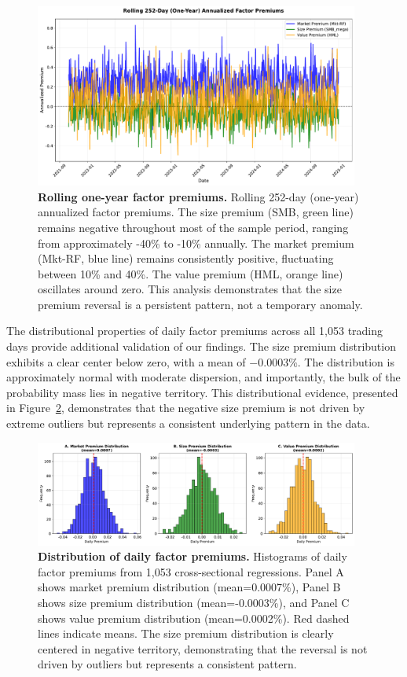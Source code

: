 \documentclass[10pt,letterpaper]{article}
\begin{document}
\begin{figure}[!h]
\centering
\includegraphics[width=0.95\textwidth]{figures/fig3_rolling_window.pdf}
\caption{\textbf{Rolling one-year factor premiums.}
Rolling 252-day (one-year) annualized factor premiums. The size premium (SMB, green line) remains negative throughout most of the sample period, ranging from approximately -40\% to -10\% annually. The market premium (Mkt-RF, blue line) remains consistently positive, fluctuating between 10\% and 40\%. The value premium (HML, orange line) oscillates around zero. This analysis demonstrates that the size premium reversal is a persistent pattern, not a temporary anomaly.}
\label{fig:rolling}
\end{figure}

The distributional properties of daily factor premiums across all 1,053 trading days provide additional validation of our findings. The size premium distribution exhibits a clear center below zero, with a mean of $-0.0003\%$. The distribution is approximately normal with moderate dispersion, and importantly, the bulk of the probability mass lies in negative territory. This distributional evidence, presented in Figure~\ref{fig:premium_dist}, demonstrates that the negative size premium is not driven by extreme outliers but represents a consistent underlying pattern in the data.

\begin{figure}[!h]
\centering
\includegraphics[width=0.95\textwidth]{figures/fig6_premium_distributions.pdf}
\caption{\textbf{Distribution of daily factor premiums.}
Histograms of daily factor premiums from 1,053 cross-sectional regressions. Panel A shows market premium distribution (mean=0.0007\%), Panel B shows size premium distribution (mean=-0.0003\%), and Panel C shows value premium distribution (mean=0.0002\%). Red dashed lines indicate means. The size premium distribution is clearly centered in negative territory, demonstrating that the reversal is not driven by outliers but represents a consistent pattern.}
\label{fig:premium_dist}
\end{figure}
\end{document}
